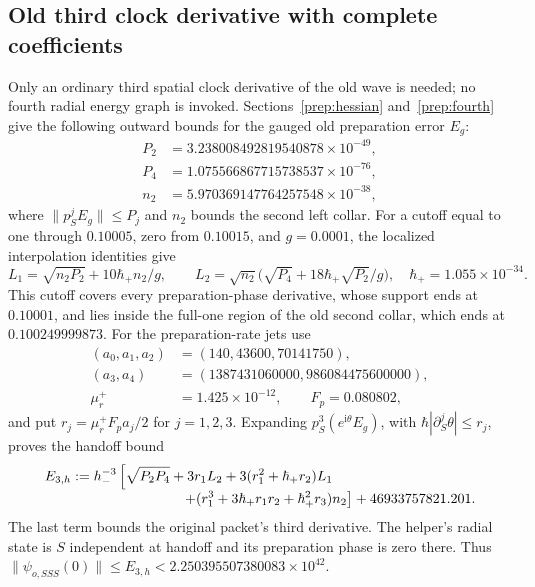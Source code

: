 \documentclass[11pt]{article}
\theoremstyle{definition}\newtheorem{definition}[theorem]{Definition}
\theoremstyle{remark}\newtheorem{remark}[theorem]{Remark}
\begin{document}
\subsection{Old third clock derivative with complete coefficients}
\label{prefix:oldthird}
Only an ordinary third spatial clock derivative of the old wave is
needed; no fourth radial energy graph is invoked.
Sections~\ref{prep:hessian} and~\ref{prep:fourth} give the following
outward bounds for the gauged old preparation error $E_g$:
\[
 \begin{aligned}
 P_2&=3.238008492819540878\times10^{-49},\\
 P_4&=1.075566867715738537\times10^{-76},\\
 n_2&=5.970369147764257548\times10^{-38},
 \end{aligned}
\]
where $\|p_S^jE_g\|\le P_j$ and $n_2$ bounds the second left collar.
For a cutoff equal to one through $0.10005$, zero from $0.10015$, and
$g=0.0001$, the localized interpolation identities give
\[
 L_1=\sqrt{n_2P_2}+10\hbar_+ n_2/g,\qquad
 L_2=\sqrt{n_2}\bigl(\sqrt{P_4}+18\hbar_+\sqrt{P_2}/g\bigr),
 \quad \hbar_+=1.055\times10^{-34}.
\]
This cutoff covers every preparation-phase derivative, whose support
ends at $0.10001$, and lies inside the full-one region of the old
second collar, which ends at $0.100249999873$.
For the preparation-rate jets use
\[
 \begin{aligned}
 (a_0,a_1,a_2)&=(140,43600,70141750),\\
 (a_3,a_4)&=(1387431060000,986084475600000),\\
 \mu_r^+&=1.425\times10^{-12},\qquad F_p=0.080802,
 \end{aligned}
\]
and put $r_j=\mu_r^+F_pa_j/2$ for $j=1,2,3$.
Expanding $p_S^3(e^{\mathrm i\theta}E_g)$, with
$\hbar|\partial_S^j\theta|\le r_j$, proves the handoff bound
\begin{align}
 E_{3,h}:={}&h_-^{-3}\left[
 \sqrt{P_2P_4}+3r_1L_2+3(r_1^2+\hbar_+r_2)L_1\right.\nonumber\\[-1mm]
 &\left.\hspace{22mm}
 +(r_1^3+3\hbar_+r_1r_2+\hbar_+^2r_3)n_2\right]
                         +46933757821.201.
 \label{prefix:oldinitial}
\end{align}
The last term bounds the original packet's third derivative.  The
helper's radial state is $S$ independent at handoff and its preparation
phase is zero there.  Thus
$\|\psi_{o,SSS}(0)\|\le E_{3,h}<2.250395507380083\times10^{42}$.
\end{document}
